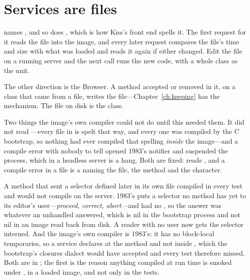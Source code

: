 \section{Services are files}

 names , and so does
, which is how Kiss's front end spells it. The first
request for it reads the file into the image, and every later request
compares the file's time and size with what was loaded and reads it again if
either changed. Edit the file on a running server and the next call runs the
new code, with a whole class as the unit.

The other direction is the Browser. A method accepted or removed in it, on a
class that came from a file, writes the file---Chapter~\ref{ch:keeping} has
the mechanism. The file on disk is the class.

\begin{stnote}
Two things the image's own compiler could not do until this needed them. It
did not read \ct{:=}---every file in  is spelt that way, and every
one was compiled by the C bootstrap, so nothing had ever compiled that
spelling \emph{inside} the image---and a compile error with nobody to tell
opened 1983's  notifier and suspended the process, which in
a headless server is a hang. Both are fixed:  reads \ct{:=}, and
a compile error in a file is a  naming the file, the method
and the character.
\end{stnote}

\begin{stnote}
A method that sent a selector defined later in its own file compiled in
every test and would not compile on the server. 1983's  puts a
selector no method has yet to its editor's user---\emph{proceed, correct,
abort}---and  had no , so the answer was
whatever an unhandled  answered, which is nil in the
bootstrap process and not nil in an image read back from disk. A reader
with no user now gets the selector interned. And the image's own compiler
is 1983's: it has no block-local temporaries, so a service declares
 at the method and not inside \ct{[:each | ...]}, which the
bootstrap's closures dialect would have accepted and every test therefore
missed. Both are in ; the first is the reason anything
compiled at run time is smoked under , in a loaded image, and
not only in the tests.
\end{stnote}

